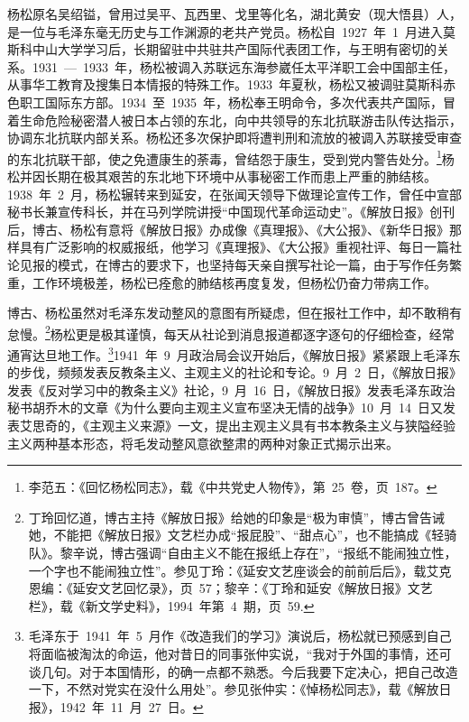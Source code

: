 杨松原名吴绍镒，曾用过吴平、瓦西里、戈里等化名，湖北黄安（现大悟县）人，是一位与毛泽东毫无历史与工作渊源的老共产党员。杨松自~1927~年~1~月进入莫斯科中山大学学习后，长期留驻中共驻共产国际代表团工作，与王明有密切的关系。1931~—~1933~年，杨松被调入苏联远东海参崴任太平洋职工会中国部主任，从事华工教育及搜集日本情报的特殊工作。1933~年夏秋，杨松又被调驻莫斯科赤色职工国际东方部。1934~至~1935~年，杨松奉王明命令，多次代表共产国际，冒着生命危险秘密潜人被日本占领的东北，向中共领导的东北抗联游击队传达指示，协调东北抗联内部关系。杨松还多次保护即将遭判刑和流放的被调入苏联接受审查的东北抗联干部，使之免遭康生的荼毒，曾结怨于康生，受到党内警告处分。\footnote{李范五：《回忆杨松同志》，载《中共党史人物传》，第~25~卷，页~187。}杨松并因长期在极其艰苦的东北地下环境中从事秘密工作而患上严重的肺结核。1938~年~2~月，杨松辗转来到延安，在张闻天领导下做理论宣传工作，曾任中宣部秘书长兼宣传科长，并在马列学院讲授“中国现代革命运动史”。《解放日报》创刊后，博古、杨松有意将《解放日报》办成像《真理报》、《大公报》、《新华日报》那样具有广泛影响的权威报纸，他学习《真理报》、《大公报》重视社评、每日一篇社论见报的模式，在博古的要求下，也坚持每天亲自撰写社论一篇，由于写作任务繁重，工作环境极差，杨松已痊愈的肺结核再度复发，但杨松仍奋力带病工作。

博古、杨松虽然对毛泽东发动整风的意图有所疑虑，但在报社工作中，却不敢稍有怠慢。\footnote{丁玲回忆道，博古主持《解放日报》给她的印象是“极为审慎”，博古曾告诫她，不能把《解放日报》文艺栏办成“报屁股”、“甜点心”，也不能搞成《轻骑队》。黎辛说，博古强调“自由主义不能在报纸上存在”，“报纸不能闹独立性，一个字也不能闹独立性”。参见丁玲：《延安文艺座谈会的前前后后》，载艾克恩编：《延安文艺回忆录》，页~57；黎辛：《丁玲和延安《解放日报》文艺栏》，载《新文学史料》，1994~年第~4~期，页~59.}杨松更是极其谨慎，每天从社论到消息报道都逐字逐句的仔细检查，经常通宵达旦地工作。\footnote{毛泽东于~1941~年~5~月作《改造我们的学习》演说后，杨松就已预感到自己将面临被淘汰的命运，他对昔日的同事张仲实说，“我对于外国的事情，还可谈几句。对于本国情形，的确一点都不熟悉。今后我要下定决心，把自己改造一下，不然对党实在没什么用处”。参见张仲实：《悼杨松同志》，载《解放日报》，1942~年~11~月~27~日。}1941~年~9~月政治局会议开始后，《解放日报》紧紧跟上毛泽东的步伐，频频发表反教条主义、主观主义的社论和专论。9~月~2~日，《解放日报》发表《反对学习中的教条主义》社论，9~月~16~日，《解放日报》发表毛泽东政治秘书胡乔木的文章《为什么要向主观主义宣布坚决无情的战争》10~月~14~日又发表艾思奇的，《主观主义来源》一文，提出主观主义具有书本教条主义与狭隘经验主义两种基本形态，将毛发动整风意欲整肃的两种对象正式揭示出来。


